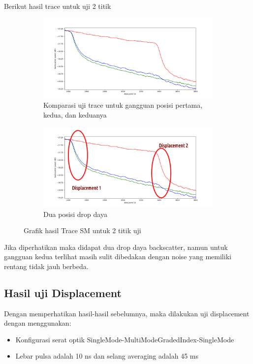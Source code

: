 \documentclass[12pt]{article}
\begin{document}
	Berikut hasil trace untuk uji 2 titik
	
	\begin{figure}[!h]
		\centering
		\captionsetup{justification=centering}
		\begin{subfigure}[h]{\textwidth}
			\includegraphics[width=\textwidth]{images/Bab_4/smsm}	
			\caption{\small{Komparasi uji trace untuk gangguan posisi pertama, kedua, dan keduanya}}		
		\end{subfigure}
		\begin{subfigure}[h]{0.8\textwidth}
			\includegraphics[width=\linewidth]{images/Bab_4/smsm2}
			\caption{\small{Dua posisi drop daya}}			
		\end{subfigure}
		\caption[Uji Pagar]{\small{Grafik hasil Trace SM untuk 2 titik uji}}
	\end{figure}

	Jika diperhatikan maka didapat dua drop daya backscatter, namun untuk gangguan kedua terlihat masih sulit dibedakan dengan noise yang memiliki rentang tidak jauh berbeda.

		
	\newpage
	
	\subsection{Hasil uji Displacement}
	Dengan memperhatikan hasil-hasil sebelumnya, maka dilakukan uji displacement dengan menggunakan:
	\begin{itemize}
		\item Konfigurasi serat optik SingleMode-MultiModeGradedIndex-SingleMode
		\item Lebar pulsa adalah 10 ns dan selang averaging adalah 45 ms
	\end{itemize}
\end{document}
